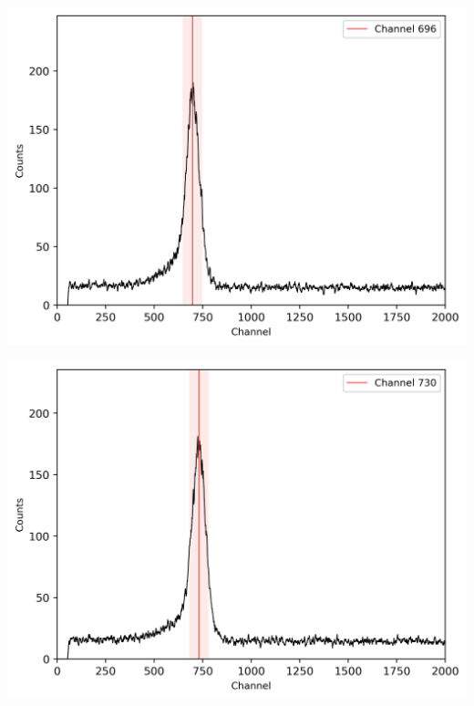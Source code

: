 \begin{center}
    \begin{adjustbox}{max width=\linewidth, keepaspectratio}
        \includegraphics[]{png/137CsTPHC40ns}
    \end{adjustbox}
    \label{fig:}
\end{center}
%
\begin{center}
    \begin{adjustbox}{max width=\linewidth, keepaspectratio}
        \includegraphics[]{png/137CsTPHC60ns}
    \end{adjustbox}
    \label{fig:}
\end{center}
%
